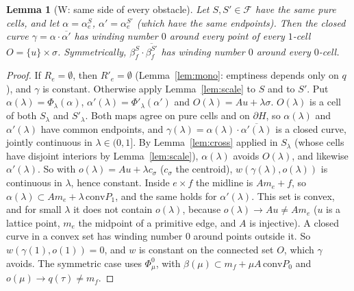 \documentclass[11pt]{article}
\newtheorem{lemma}[theorem]{Lemma}
\theoremstyle{definition}
\begin{document}
\begin{lemma}[W: same side of every obstacle]\label{lem:W}
Let $S,S'\in\mathcal F$ have the same pure cells, and let $\alpha=\alpha_e^S$, $\alpha'=\alpha_e^{S'}$ (which have the same endpoints). Then the closed curve
$\gamma=\alpha\cdot\overline{\alpha'}$ has winding number $0$ around every point of every $1$-cell $O=\{u\}\times\sigma$. Symmetrically, $\beta_f^S\cdot\overline{\beta_f^{S'}}$
has winding number $0$ around every $0$-cell.
\end{lemma}
\begin{proof}
If $R_e=\emptyset$, then $R'_e=\emptyset$ (Lemma~\ref{lem:mono}: emptiness depends only on $q$), and $\gamma$ is constant. Otherwise apply Lemma~\ref{lem:scale} to $S$ and to $S'$.
Put $\alpha(\lambda)=\Phi_\lambda(\alpha)$, $\alpha'(\lambda)=\Phi'_\lambda(\alpha')$ and $O(\lambda)=Au+\lambda\sigma$. $O(\lambda)$ is a cell of both $S_\lambda$ and $S'_\lambda$. Both
maps agree on pure cells and on $\partial H$, so $\alpha(\lambda)$ and $\alpha'(\lambda)$ have common endpoints, and $\gamma(\lambda)=\alpha(\lambda)\cdot\overline{\alpha'(\lambda)}$ is a closed curve, jointly continuous in
$\lambda\in(0,1]$. By Lemma~\ref{lem:cross} applied in $S_\lambda$ (whose cells have disjoint interiors by Lemma~\ref{lem:scale}), $\alpha(\lambda)$ avoids $O(\lambda)$, and likewise $\alpha'(\lambda)$.
So with $o(\lambda)=Au+\lambda c_\sigma$ ($c_\sigma$ the centroid), $w(\gamma(\lambda),o(\lambda))$ is continuous in $\lambda$, hence constant.
Inside $e\times f$ the midline is $Am_e+f$, so $\alpha(\lambda)\subset Am_e+\lambda\,\mathrm{conv}P_1$, and the same holds for $\alpha'(\lambda)$. This set is convex, and for small $\lambda$ it does not contain $o(\lambda)$,
because $o(\lambda)\to Au\neq Am_e$ ($u$ is a lattice point, $m_e$ the midpoint of a primitive edge, and $A$ is injective). A closed curve in a convex set has
winding number $0$ around points outside it. So $w(\gamma(1),o(1))=0$, and $w$ is constant on the connected set $O$, which $\gamma$ avoids. The symmetric case uses $\Phi^0_\mu$, with
$\beta(\mu)\subset m_f+\mu A\,\mathrm{conv}P_0$ and $o(\mu)\to q(\tau)\neq m_f$.
\end{proof}
\end{document}
